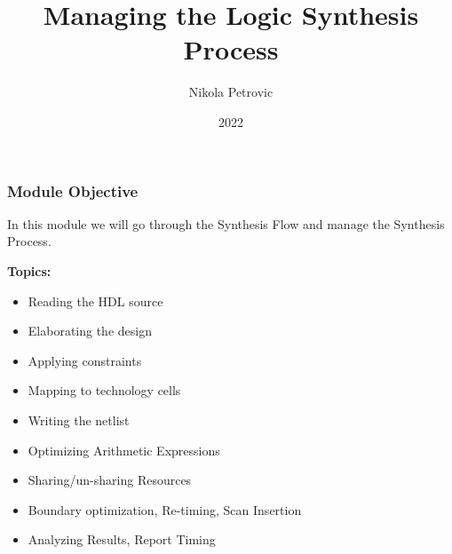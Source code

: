 \documentclass[t, notes, xcolor=table]{beamer}
\title{Managing the Logic Synthesis Process}
\author{Nikola Petrovic}
\institute{University of Belgrade, School of Electrical Engineering}
\date{2022}
\begin{document}
\frame{\titlepage}

\begin{frame}
\frametitle{Module Objective}
\normalsize{
In this module we will go through the Synthesis Flow and manage the Synthesis Process.
\newline

\textbf{Topics:}
\begin{itemize}
\item Reading the HDL source
\item Elaborating the design
\item Applying constraints
\item Mapping to technology cells
\item Writing the netlist
\item Optimizing Arithmetic Expressions
\item Sharing/un-sharing Resources
\item Boundary optimization, Re-timing, Scan Insertion
\item Analyzing Results, Report Timing
\end{itemize}
}
\end{frame}
\end{document}
